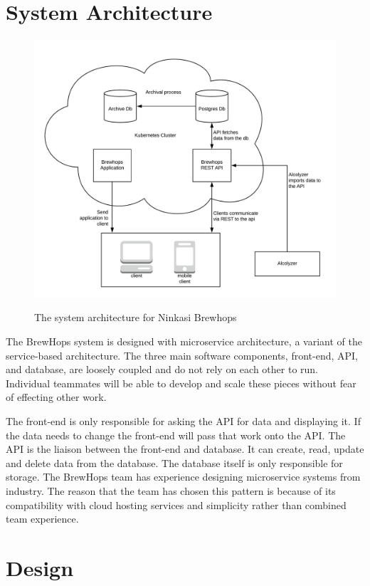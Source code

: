 \documentclass[draftclsnofoot,onecolumn,journal,letterpaper,compsoc,10pt]{IEEEtran}
\begin{document}
\section{System Architecture}
\begin{figure}[H]
    \centering
    \caption{The system architecture for Ninkasi Brewhops}
    \includegraphics[origin=c,width=\textwidth,keepaspectratio]{./diagrams/brewhops-architecture.jpeg}
    \label{System Architecture}
\end{figure}

The BrewHops system is designed with microservice architecture, a variant of the service-based architecture. The three main software components, front-end, API, and database, are loosely coupled and do not rely on each other to run. Individual teammates will be able to develop and scale these pieces without fear of effecting other work.

The front-end is only responsible for asking the API for data and displaying it. If the data needs to change the front-end will pass that work onto the API. The API is the liaison between the front-end and database. It can create, read, update and delete data from the database. The database itself is only responsible for storage. The BrewHops team has experience designing microservice systems from industry. The reason that the team has chosen this pattern is because of its compatibility with cloud hosting services and simplicity rather than combined team experience. 
\section{Design}
\end{document}
